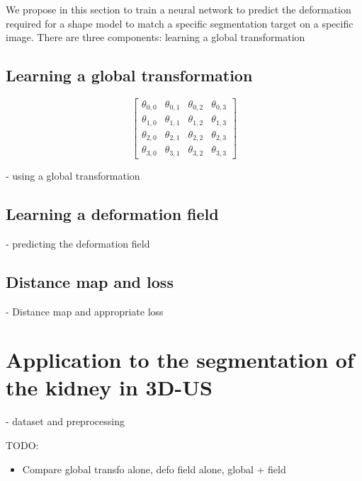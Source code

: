 We propose in this section to train a neural network to predict the deformation required for a shape model to match a specific segmentation target on a specific image. There are three components: learning a global transformation 


\subsection{Learning a global transformation}

\begin{equation}
    \begin{bmatrix}
    \theta_{0, 0} & \theta_{0, 1} & \theta_{0, 2} & \theta_{0, 3} \\
    \theta_{1, 0} & \theta_{1, 1} & \theta_{1, 2} & \theta_{1, 3} \\
    \theta_{2, 0} & \theta_{2, 1} & \theta_{2, 2} & \theta_{2, 3} \\ 
    \theta_{3, 0} & \theta_{3, 1} & \theta_{3, 2} & \theta_{3, 3} 
    \end{bmatrix}
\end{equation}

- using a global transformation

\subsection{Learning a deformation field}

- predicting the deformation field

\subsection{Distance map and loss}

- Distance map and appropriate loss

\section{Application to the segmentation of the kidney in 3D-US}

- dataset and preprocessing

TODO:
\begin{itemize}
    \item Compare global transfo alone, defo field alone, global + field
\end{itemize}


